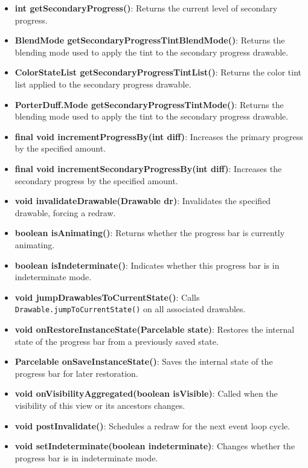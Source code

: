 \documentclass{report}
\begin{document}
\begin{itemize}
\begin{itemize}
                \item \textbf{int getSecondaryProgress()}: Returns the current level of secondary progress.
                \item \textbf{BlendMode getSecondaryProgressTintBlendMode()}: Returns the blending mode used to apply the tint to the secondary progress drawable.
                \item \textbf{ColorStateList getSecondaryProgressTintList()}: Returns the color tint list applied to the secondary progress drawable.
                \item \textbf{PorterDuff.Mode getSecondaryProgressTintMode()}: Returns the blending mode used to apply the tint to the secondary progress drawable.
                \item \textbf{final void incrementProgressBy(int diff)}: Increases the primary progress by the specified amount.
                \item \textbf{final void incrementSecondaryProgressBy(int diff)}: Increases the secondary progress by the specified amount.
                \item \textbf{void invalidateDrawable(Drawable dr)}: Invalidates the specified drawable, forcing a redraw.
                \item \textbf{boolean isAnimating()}: Returns whether the progress bar is currently animating.
                \item \textbf{boolean isIndeterminate()}: Indicates whether this progress bar is in indeterminate mode.
                \item \textbf{void jumpDrawablesToCurrentState()}: Calls \texttt{Drawable.jumpToCurrentState()} on all associated drawables.
                \item \textbf{void onRestoreInstanceState(Parcelable state)}: Restores the internal state of the progress bar from a previously saved state.
                \item \textbf{Parcelable onSaveInstanceState()}: Saves the internal state of the progress bar for later restoration.
                \item \textbf{void onVisibilityAggregated(boolean isVisible)}: Called when the visibility of this view or its ancestors changes.
                \item \textbf{void postInvalidate()}: Schedules a redraw for the next event loop cycle.
                \item \textbf{void setIndeterminate(boolean indeterminate)}: Changes whether the progress bar is in indeterminate mode.

\end{itemize}
\end{itemize}
\end{document}
